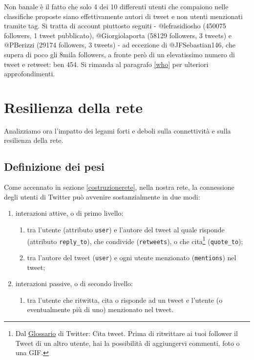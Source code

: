         Non banale è il fatto che solo 4 dei 10 differenti utenti che compaiono nelle classifiche proposte siano effettivamente autori di tweet e non utenti menzionati tramite tag. Si tratta di account piuttosto seguiti - @lefrasidiosho (450075 followers, 1 tweet pubblicato), @Giorgiolaporta (58129 followers, 3 tweets) e @PBerizzi (29174 followers, 3 tweets) - ad eccezione di @JFSebastian146, che supera di poco gli 8mila followers, a fronte però di un elevatissimo numero di tweet e  retweet: ben 454. Si rimanda al paragrafo \ref{who} per ulteriori approfondimenti. 
   
    
    \section{Resilienza della rete}\label{netres}
    
    Analizziamo ora l'impatto dei legami forti e deboli sulla connettività e sulla resilienza della rete.
        
    \subsection{Definizione dei pesi}
    
    Come accennato in sezione \ref{costruzionerete}, nella nostra rete, la connessione degli utenti di Twitter può avvenire sostanzialmente in due modi: 
        \begin{enumerate}\label{interazione}
            \item interazioni attive, o di primo livello:
            \begin{enumerate}
                \item tra l'utente (attributo \texttt{user}) e l'autore del tweet al quale risponde (attributo \texttt{reply\_to}), che condivide (\texttt{retweets}), o che cita\footnote{Dal \href{https://help.twitter.com/it/resources/glossary}{Glossario} di Twitter: Cita tweet. Prima di ritwittare ai tuoi follower il Tweet di un altro utente, hai la possibilità di aggiungervi commenti, foto o una GIF.} (\texttt{quote\_to});
                \item tra l'autore del tweet (\texttt{user}) e ogni utente menzionato (\texttt{mentions}) nel tweet;
            \end{enumerate}
            \item interazioni passive, o di secondo livello:
             \begin{enumerate} 
                \item tra l'utente che ritwitta, cita o risponde ad un tweet e l'utente (o eventualmente più di uno) menzionato nel tweet. 
             \end{enumerate}
        \end{enumerate}
    

